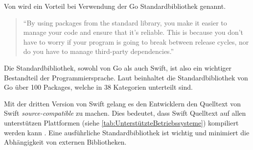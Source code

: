 Von \cite[S.184]{Kennedy.2016} wird ein Vorteil bei Verwendung der Go Standardbibliothek genannt. 

\begin{quote}
\enquote{By using packages from the standard library, you make it easier to manage your code and ensure that it’s reliable. This is because you
don’t have to worry if your program is going to break between release cycles, nor do
you have to manage third-party dependencies.} \cite[S.185]{Kennedy.2016}
\end{quote}

Die Standardbibliothek, sowohl von Go als auch Swift, ist also ein wichtiger Bestandteil der Programmiersprache. 
Laut \cite[S.185]{Kennedy.2016} beinhaltet die Standardbibliothek von Go über 100 Packages, welche in 38 Kategorien unterteilt sind.

Mit der dritten Version von Swift gelang es den Entwicklern den Quelltext von Swift \textit{source-compatible} zu machen.
Dies bedeutet, dass Swift Quelltext auf allen unterstützen Plattformen (siehe \autoref{tab:UnterstützteBetriebssysteme}) kompiliert werden kann \cite[S.8]{Hoffman.2017}.
Eine ausführliche Standardbibliothek ist wichtig und minimiert die Abhängigkeit von externen Bibliotheken.



